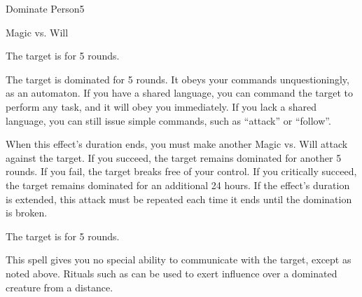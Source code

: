 \begin{spellsection}{Dominate Person}{5}
\begin{spellheader}
\end{spellheader}
\begin{spellcontent}
    \begin{spelltargetinginfo}
    \end{spelltargetinginfo}
    \begin{spelleffects}
        \begin{spellattack}{Magic vs. Will}

            \spellsuccess The target is \confused for 5 rounds.

            \spellcritical The target is dominated for 5 rounds. It obeys your commands unquestioningly, as an automaton. If you have a shared language, you can command the target to perform any task, and it will obey you immediately. If you lack a shared language, you can still issue simple commands, such as ``attack'' or ``follow''.
            
            When this effect's duration ends, you must make another Magic vs. Will attack against the target. If you succeed, the target remains dominated for another 5 rounds. If you fail, the target breaks free of your control. If you critically succeed, the target remains dominated for an additional 24 hours. If the effect's duration is extended, this attack must be repeated each time it ends until the domination is broken.

            \spellfailure The target is \dazed for 5 rounds.
        \end{spellattack}
        \spelldur \durshort \dismissable
    \end{spelleffects}
\end{spellcontent}
\begin{spellfooter}
    \spellnotes This spell gives you no special ability to communicate with the target, except as noted above. Rituals such as  can be used to exert influence over a dominated creature from a distance.
\end{spellfooter}
\end{spellsection}

